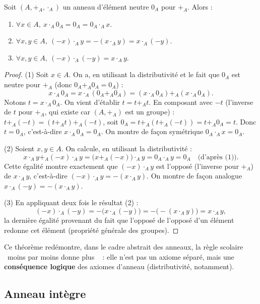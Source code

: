 \documentclass[a4paper,12pt,openany]{book}
\providecommand{\og}{\guillemotleft~}
\providecommand{\fg}{\ifhmode~\fi\guillemotright}
\begin{document}
\begin{theoreme}
Soit $(A,+_A,\cdot_A)$ un anneau d'élément neutre $0_A$ pour $+_A$. Alors :
\begin{enumerate}
  \item $\forall x\in A,\ x\cdot_A 0_A = 0_A = 0_A \cdot_A x$.
  \item $\forall x,y\in A,\ (-x)\cdot_A y = -(x\cdot_A y) = x\cdot_A(-y)$.
  \item $\forall x,y\in A,\ (-x)\cdot_A(-y) = x\cdot_A y$.
\end{enumerate}
\end{theoreme}

\begin{proof}
(1) Soit $x\in A$. On a, en utilisant la distributivité et le fait que
$0_A$ est neutre pour $+_A$ (donc $0_A+_A0_A=0_A$) :
\[
x\cdot_A 0_A = x\cdot_A(0_A+_A0_A) = (x\cdot_A0_A) +_A (x\cdot_A0_A).
\]
Notons $t = x\cdot_A 0_A$. On vient d'établir $t = t+_At$. En composant
avec $-t$ (l'inverse de $t$ pour $+_A$, qui existe car $(A,+_A)$ est un
groupe) : $t +_A(-t) = (t+_At)+_A(-t)$, soit $0_A = t +_A (t+_A(-t)) =
t+_A0_A = t$. Donc $t=0_A$, c'est-à-dire $x\cdot_A0_A=0_A$. On montre de
façon symétrique $0_A\cdot_Ax=0_A$.

(2) Soient $x,y\in A$. On calcule, en utilisant la distributivité :
\[
x\cdot_Ay +_A (-x)\cdot_Ay = \big(x+_A(-x)\big)\cdot_Ay = 0_A\cdot_Ay =
0_A \quad\text{(d'après (1))}.
\]
Cette égalité montre exactement que $(-x)\cdot_Ay$ est l'opposé (l'inverse
pour $+_A$) de $x\cdot_Ay$, c'est-à-dire $(-x)\cdot_Ay = -(x\cdot_Ay)$. On
montre de façon analogue $x\cdot_A(-y) = -(x\cdot_Ay)$.

(3) En appliquant deux fois le résultat (2) :
\[
(-x)\cdot_A(-y) = -\big(x\cdot_A(-y)\big) = -\big(-(x\cdot_Ay)\big) =
x\cdot_Ay,
\]
la dernière égalité provenant du fait que l'opposé de l'opposé d'un
élément redonne cet élément (propriété générale des groupes).
\end{proof}

\begin{remarque}
Ce théorème redémontre, dans le cadre abstrait des anneaux, la règle
scolaire \og moins par moins donne plus \fg{} : elle n'est pas un axiome
séparé, mais une \textbf{conséquence logique} des axiomes d'anneau
(distributivité, notamment).
\end{remarque}

\subsection{Anneau intègre}
\end{document}
